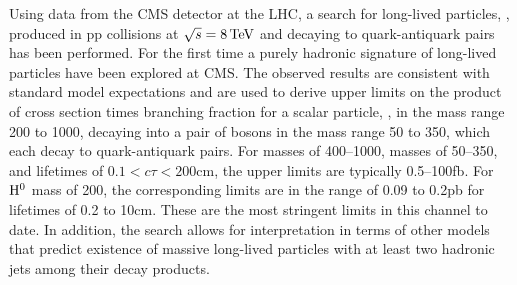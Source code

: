 Using data from the CMS detector at the LHC,
a search for long-lived particles, \X, produced in pp collisions at $\sqrt{s} = 8\,\text{Te\hspace{-.08em}V}$ and decaying
to quark-antiquark pairs has been performed. For the first time a purely hadronic signature
of long-lived particles have been explored at CMS.
The observed results are consistent with standard model expectations and are used to derive upper
limits on the product of cross section times branching fraction for a scalar particle,
 \Higgs, in the mass range 200 to 1000\GeV, decaying into a pair of \X bosons in the mass
range 50 to 350\GeV, which each decay to quark-antiquark pairs. For \Higgs masses of 400--1000\GeV, \X
masses of 50--350\GeV, and \X lifetimes of $0.1<c\tau<200$\:cm, the upper limits are typically 0.5--100\:fb.
 For $\mathrm{H}^{0}$ mass of 200\GeV, the corresponding limits are in the range of 0.09 to 0.2\:pb for \X
lifetimes of 0.2 to 10\:cm. These are the most stringent limits in this channel to date.
In addition, the search allows for interpretation in terms of other models that predict 
existence of massive long-lived particles with at least two hadronic
jets among their decay products.
